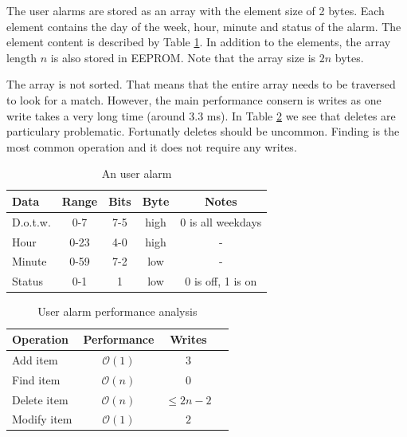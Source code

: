 \documentclass{awac02}
\begin{document}
The user alarms are stored as an array with the element size of 2
bytes. Each element contains the day of the week, hour, minute and status of
the alarm. The element content is described by Table \ref{tab:user-alarm}.  In
addition to the elements, the array length $n$ is also stored in EEPROM. Note
that the array size is $2n$ bytes.

The array is not sorted. That means that the entire array needs to be traversed
to look for a match. However, the main performance consern is writes as one write
takes a very long time (around 3.3 ms). In Table
\ref{tab:user-alarm-performance} we see that deletes are particulary
problematic. Fortunatly deletes should be uncommon. Finding is the most common
operation and it does not require any writes.

\begin{table}[ht]
\centering
\begin{tabular}{| l | c | c | c | c |}
    \hline
    Data & Range & Bits & Byte & Notes\\
    \hline
    D.o.t.w. & 0-7 & 7-5 & high & 0 is all weekdays\\
    Hour & 0-23 & 4-0 & high & -\\
    Minute & 0-59 & 7-2 & low & -\\
    Status & 0-1 & 1 & low & 0 is off, 1 is on\\
    \hline
\end{tabular}
\caption{An user alarm}
\label{tab:user-alarm}
\end{table}

\begin{table}[ht]
\centering
\begin{tabular}{| l | c | c | c |}
    \hline
    Operation & Performance & Writes \\
    \hline
    Add item & $\mathcal{O}(1)$ & $3$ \\
    Find item & $\mathcal{O}(n)$ & $0$ \\
    Delete item & $\mathcal{O}(n)$ & $\leq 2n - 2$ \\
    Modify item & $\mathcal{O}(1)$ & $2$ \\
    \hline
\end{tabular}
\caption{User alarm performance analysis}
\label{tab:user-alarm-performance}
\end{table}
\end{document}

